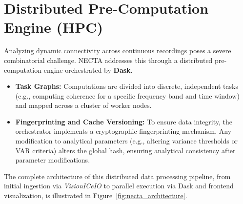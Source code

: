 \section{Distributed Pre-Computation Engine (HPC)}
Analyzing dynamic connectivity across continuous recordings poses a severe combinatorial challenge. NECTA addresses this through a distributed pre-computation engine orchestrated by \textbf{Dask}\cite{rocklin2015dask}.
\begin{itemize}
\item \textbf{Task Graphs:} Computations are divided into discrete, independent tasks (e.g., computing coherence for a specific frequency band and time window) and mapped across a cluster of worker nodes.

\item \textbf{Fingerprinting and Cache Versioning:} To ensure data integrity, the orchestrator implements a cryptographic fingerprinting mechanism. Any modification to analytical parameters (e.g., altering variance thresholds or VAR criteria) alters the global hash, ensuring analytical consistency after parameter modifications.

\end{itemize}

The complete architecture of this distributed data processing pipeline, from initial ingestion via \textit{VisionICeIO} to parallel execution via Dask and frontend visualization, is illustrated in Figure~\ref{fig:necta_architecture}.

\vspace{0.5cm}


